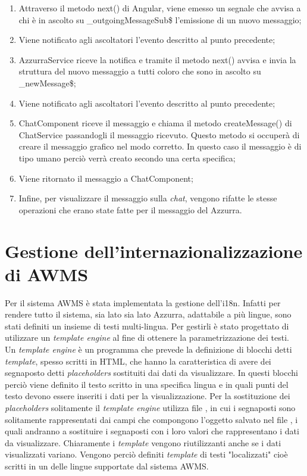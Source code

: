 \begin{enumerate}
	\item Attraverso il metodo next() di Angular, viene emesso un segnale che avvisa a chi è in ascolto su \_outgoingMessageSub\$ l'emissione di un nuovo messaggio;
	\item Viene notificato agli ascoltatori l'evento descritto al punto precedente;
	\item AzzurraService riceve la notifica e tramite il metodo next() avvisa e invia la struttura del nuovo messaggio a tutti coloro che sono in ascolto su \_newMessage\$;
	\item Viene notificato agli ascoltatori l'evento descritto al punto precedente;
	\item ChatComponent riceve il messaggio e chiama il metodo createMessage() di ChatService passandogli il messaggio ricevuto. Questo metodo si occuperà di creare il messaggio grafico nel modo corretto. In questo caso il messaggio è di tipo umano perciò verrà creato secondo una certa specifica;
	\item Viene ritornato il messaggio a ChatComponent;
	\item Infine, per visualizzare il messaggio sulla \emph{chat}, vengono rifatte le stesse operazioni che erano state fatte per il messaggio del  Azzurra.
\end{enumerate}

\section{Gestione dell'internazionalizzazione di AWMS}%
Per il sistema \gls{AWMS} è stata implementata la gestione dell'\gls{i18n}. Infatti per rendere tutto il sistema, sia lato  sia lato Azzurra, adattabile a più lingue, sono stati definiti un insieme di testi multi-lingua. Per gestirli è stato progettato di utilizzare un \emph{template engine} al fine di ottenere la parametrizzazione dei testi. \\

Un \emph{template engine} è un programma che prevede la definizione di blocchi detti \emph{template}, spesso scritti in \gls{HTML}, che hanno la caratteristica di avere dei segnaposto detti \emph{placeholders} sostituiti dai dati da visualizzare. In questi blocchi perciò viene definito il testo scritto in una specifica lingua e in quali punti del testo devono essere inseriti i dati per la visualizzazione. Per la sostituzione dei \emph{placeholders} solitamente il \emph{template engine} utilizza file , in cui i segnaposti sono solitamente rappresentati dai campi che compongono l’oggetto salvato nel file , i quali andranno a sostituire i segnaposti con i loro valori che rappresentano i dati da visualizzare. Chiaramente i \emph{template} vengono riutilizzanti anche se i dati visualizzati variano. Vengono perciò definiti \emph{template} di testi "localizzati" cioè scritti in un delle lingue supportate dal sistema \gls{AWMS}.\\

